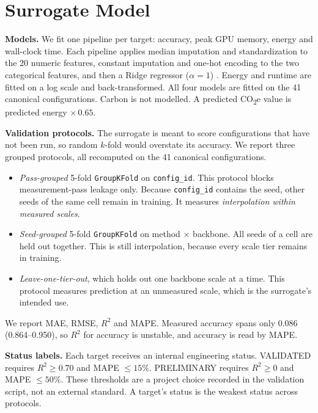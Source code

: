 \documentclass[conference]{IEEEtran}
\newcommand{\COtwo}{CO\textsubscript{2}e}
\begin{document}
\section{Surrogate Model}

\textbf{Models.} We fit one pipeline per target: accuracy, peak GPU memory, energy and
wall-clock time. Each pipeline applies median imputation and standardization to the 20
numeric features, constant imputation and one-hot encoding to the two categorical features,
and then a Ridge regressor ($\alpha=1$) \cite{pedregosa2011sklearn}. Energy and runtime are
fitted on a log scale and back-transformed. All four models are fitted on the 41 canonical
configurations. Carbon is not modelled. A predicted \COtwo{} value is predicted energy
$\times\,0.65$. %

\textbf{Validation protocols.} The surrogate is meant to score configurations that have not
been run, so random $k$-fold would overstate its accuracy. We report three grouped protocols,
all recomputed on the 41 canonical configurations. %
\begin{itemize}
\item \emph{Pass-grouped} 5-fold \texttt{GroupKFold} on \texttt{config\_id}. This protocol
blocks measurement-pass leakage only. Because \texttt{config\_id} contains the seed, other
seeds of the same cell remain in training. It measures \emph{interpolation within measured
scales}.
\item \emph{Seed-grouped} 5-fold \texttt{GroupKFold} on method $\times$ backbone. All seeds
of a cell are held out together. This is still interpolation, because every scale tier
remains in training.
\item \emph{Leave-one-tier-out}, which holds out one backbone scale at a time. This protocol
measures prediction at an unmeasured scale, which is the surrogate's intended use.
\end{itemize}
We report MAE, RMSE, $R^2$ and MAPE. Measured accuracy spans only 0.086 (0.864--0.950), so
$R^2$ for accuracy is unstable, and accuracy is read by MAPE. %

\textbf{Status labels.} Each target receives an internal engineering status. VALIDATED
requires $R^2\ge0.70$ and MAPE $\le15\%$. PRELIMINARY requires $R^2\ge0$ and
MAPE $\le50\%$. These thresholds are a project choice recorded in the validation script, not
an external standard. A target's status is the weakest status across protocols. %
\end{document}
